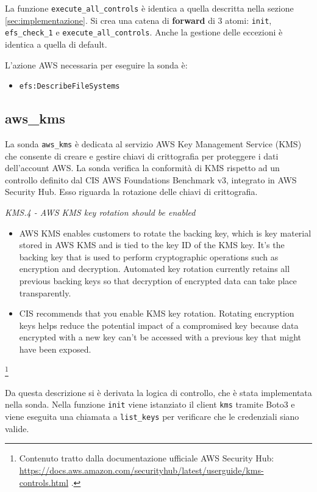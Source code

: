 La funzione \texttt{execute\_all\_controls} è identica a quella descritta nella sezione \ref{sec:implementazione}. Si crea una catena di \textbf{forward} di 3 atomi: \texttt{init}, \texttt{efs\_check\_1} e \texttt{execute\_all\_controls}. Anche la gestione delle eccezioni è identica a quella di default.

L'azione AWS necessaria per eseguire la sonda è:
\begin{itemize}
    \item \texttt{efs:DescribeFileSystems}
\end{itemize}

\subsection{aws\_kms}
\label{sec:kms}

La sonda \texttt{aws\_kms} è dedicata al servizio AWS Key Management Service (KMS) che consente di creare e gestire chiavi di crittografia per proteggere i dati dell'account AWS. La sonda verifica la conformità di KMS rispetto ad un controllo definito dal CIS AWS Foundations Benchmark v3, integrato in AWS Security Hub. Esso riguarda la rotazione delle chiavi di crittografia. 

\begin{mdframed}[backgroundcolor=gray!05, linecolor=gray!50]
\itshape
KMS.4 - AWS KMS key rotation should be enabled 
\begin{itemize}
    \item AWS KMS enables customers to rotate the backing key, which is key material stored in AWS KMS and is tied to the key ID of the KMS key. It's the backing key that is used to perform cryptographic operations such as encryption and decryption. Automated key rotation currently retains all previous backing keys so that decryption of encrypted data can take place transparently.
    \item CIS recommends that you enable KMS key rotation. Rotating encryption keys helps reduce the potential impact of a compromised key because data encrypted with a new key can't be accessed with a previous key that might have been exposed.
\end{itemize}
\end{mdframed}
\footnote{Contenuto tratto dalla documentazione ufficiale AWS Security Hub: \url{https://docs.aws.amazon.com/securityhub/latest/userguide/kms-controls.html} .}

Da questa descrizione si è derivata la logica di controllo, che è stata implementata nella sonda. Nella funzione \texttt{init} viene istanziato il client \texttt{kms} tramite Boto3 e viene eseguita una chiamata a \texttt{list\_keys} per verificare che le credenziali siano valide.

